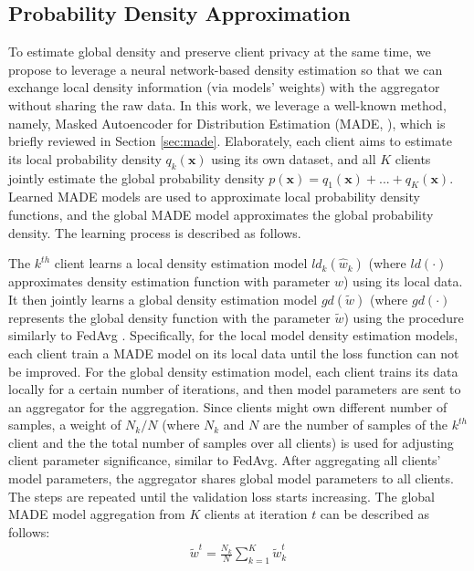 \documentclass[mathfont=newtx]{uai2023} %
\begin{document}
\subsection{Probability Density Approximation}
\label{sec:densityapproximation}
To estimate global density and preserve client privacy at the same time, we propose to leverage a neural network-based density estimation so that we can exchange local density information (via models' weights) with the aggregator without sharing the raw data. In this work, we leverage a well-known method, namely, Masked Autoencoder for Distribution Estimation (MADE, \cite{MADE}), which is briefly reviewed in Section \ref{sec:made}. Elaborately, each client aims to estimate its local probability density $q_k(\mathbf{x})$ using its own dataset, and all $K$ clients jointly estimate the global probability density $p(\mathbf{x}) = q_1(\mathbf{x})+...+q_K(\mathbf{x})$. Learned MADE models are used to approximate local probability density functions, and the global MADE model approximates the global probability density. The learning process is described as follows.    

The $k^{th}$ client learns a local density estimation model $ld_k(\hat{w}_k)$ (where $ld(\cdot)$ approximates density estimation function with parameter $\hat{w}$) using its local data. It then jointly learns a global density estimation model $gd(\tilde{w})$ (where $gd(\cdot)$ represents the global density function with the parameter $\tilde{w}$) using the procedure similarly to FedAvg \cite{OriginFL}. Specifically, for the local model density estimation models, each client train a MADE model on its local data until the loss function can not be improved. For the global density estimation model, each client trains its data locally for a certain number of iterations, and then model parameters are sent to an aggregator for the aggregation. Since clients might own different number of samples, a weight of ${N_k}/N$ (where $N_k$ and $N$ are the number of samples of the $k^{th}$ client and the the total number of samples over all clients) is used for adjusting client parameter significance, similar to FedAvg. After aggregating all clients' model parameters, the aggregator shares global model parameters to all clients. The steps are repeated until the validation loss starts increasing. The global MADE model aggregation from $K$ clients at iteration $t$ can be described as follows:
\begin{equation}
\begin{aligned}
 \tilde{w}^t = \frac{N_k}{N}\sum_{k=1}^{K} \tilde{w}^t_k 
\end{aligned}
\end{equation}
\end{document}
